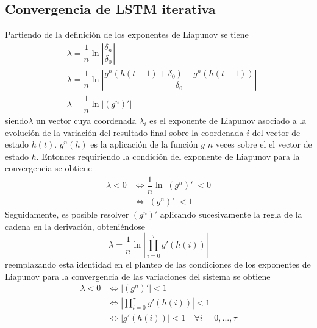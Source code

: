 \documentclass{article}
\begin{document}
	\pagebreak
	\appendix
	\begin{appendices}
		\section{Convergencia de LSTM iterativa} \label{iterativeLSTMconvergence}
		Partiendo de la definición de los exponentes de Liapunov se tiene
		\begin{equation*}
		\begin{split}
		&\lambda = \dfrac{1}{n} \ln\left\lvert\dfrac{\delta_n}{\delta_0}\right\rvert\\
		&\lambda = \dfrac{1}{n} \ln \left\lvert \dfrac{g^n(h(t-1) + \delta_0) - g^n(h(t-1))}{\delta_0} \right\rvert\\
		&\lambda = \dfrac{1}{n} \ln | (g^n)' |
		\end{split}
		\end{equation*}
		siendo$\lambda$ un vector cuya coordenada $\lambda_i$ es el exponente de Liapunov asociado a la evolución de la variación del resultado final sobre la coordenada $i$ del vector de estado $h(t)$. $g^n(h)$ es la aplicación de la función $g$ $n$ veces sobre el el vector de estado $h$. Entonces requiriendo la condición del exponente de Liapunov para la convergencia se obtiene
		\begin{equation*}
		\begin{split}
		\lambda < 0 &\iff \dfrac{1}{n} \ln | (g^n)' | < 0\\
		&\iff | (g^n)' | < 1
		\end{split}
		\end{equation*}
		Seguidamente, es posible resolver $(g^n)'$ aplicando sucesivamente la regla de la cadena en la derivación, obteniéndose
		\begin{equation*}
		\lambda = \dfrac{1}{n} \ln \left\lvert  \prod_{i = 0}^{\tau}g'(h(i)) \right\rvert 
		\end{equation*}
		reemplazando esta identidad en el planteo de las condiciones de los exponentes de Liapunov para la convergencia de las variaciones del sistema se obtiene
		\begin{equation*}
		\begin{split}
		\lambda < 0 &\iff | (g^n)' | < 1\\
		&\iff  \left\lvert  \prod_{i = 0}^{\tau}g'(h(i)) \right\rvert < 1\\
		&\iff  |g'(h(i))|  < 1 \quad \forall i = 0, ... , \tau
		\end{split}
		\end{equation*}

\end{appendices}
\end{document}
